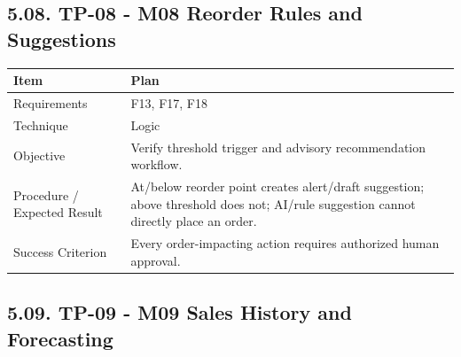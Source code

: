 \subsection{5.08. TP-08 - M08 Reorder Rules and Suggestions}\label{tp-08---m08-reorder-rules-and-suggestions}

{\def\LTcaptype{none} %
\begin{longtable}[]{|
  >{\raggedright\arraybackslash}m{}|
  >{\raggedright\arraybackslash}m{}|}
\hline
\begin{minipage}[c]{\linewidth}\raggedright
\textbf{Item}
\end{minipage} & \begin{minipage}[c]{\linewidth}\raggedright
\textbf{Plan}
\end{minipage} \\
\hline
\endhead

\endlastfoot
Requirements & F13, F17, F18 \\ \hline
Technique & Logic \\ \hline
Objective & Verify threshold trigger and advisory recommendation workflow. \\ \hline
Procedure / Expected Result & At/below reorder point creates alert/draft suggestion; above threshold does not; AI/rule suggestion cannot directly place an order. \\ \hline
Success Criterion & Every order-impacting action requires authorized human approval. \\ \hline
\end{longtable}
}

\subsection{5.09. TP-09 - M09 Sales History and Forecasting}\label{tp-09---m09-sales-history-and-forecasting}

